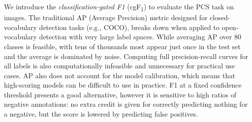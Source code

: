 \documentclass[]{fairmeta}
\newcommand{\eg}{e.g., }
\newcommand{\task}{PCS\xspace}
\newcommand{\cgf}{cgF\textsubscript{1}\xspace}
\begin{document}
We introduce the \textit{classification-gated F1} (\cgf) to evaluate the \task task on images. The traditional AP (Average Precision) metric designed for closed-vocabulary detection tasks (\eg COCO), breaks down when applied to open-vocabulary detection with very large label spaces. While averaging AP over 80 classes is feasible, with tens of thousands most appear just once in the test set and the average is dominated by noise. Computing full precision-recall curves for all labels is also computationally infeasible and unnecessary for practical use cases. AP also does not account for the model calibration, which means that high-scoring models can be difficult to use in practice.  F1 at a fixed confidence threshold presents a good alternative, however it is sensitive to high ratios of negative annotations: no extra credit is given for correctly predicting nothing for a negative, but the score is lowered by predicting false positives. 
\end{document}
